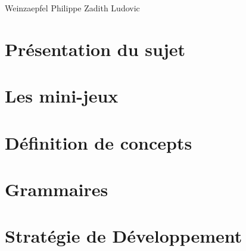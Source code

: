 \documentclass[a4paper,10pt]{article}
\begin{document}
\vspace{0.2cm}
\hspace{2cm} Weinzaepfel Philippe \hspace{1.6cm} Zadith Ludovic

\vspace{4cm}

\normalsize
\begin{abstract}
 Ce document présente la partie analyse du projet de master 1 intitulé "Plateforme de création de mini-jeux 3D sur le WEB".
 Il consiste à concevoir et à développer un outil auteur pour créer des contenus 3D très interactifs dans les pages internet.
 En particulier, il s'agit de définir un langage permettant de générer le code de mini-jeux affichés en 3D.
 Le rapport est divisé en 4 parties : la partie \ref{sec:sujet} présente de manière plus précise le sujet.
 La seconde utilise l'exemple de différents mini-jeux pour appuyer l'analyse du contenu d'un mini-jeu.
 La partie \ref{sec:concept} définit les concepts récurrents dans l'univers des jeux.
 Enfin, la dernière partie présente les grammaires proposées.
\end{abstract}

\clearpage

\vspace{0.5cm}
\section{Présentation du sujet}
\label{sec:sujet}
\vspace{0.5cm}
 

\vspace{0.5cm}
\section{Les mini-jeux}
\label{sec:minijeux}
\vspace{0.5cm}


\section{Définition de concepts}
\label{sec:concept}


\section{Grammaires}
\label{sec:grammaire}


\section{Stratégie de Développement}
\label{sec:strategie}

\end{document}
